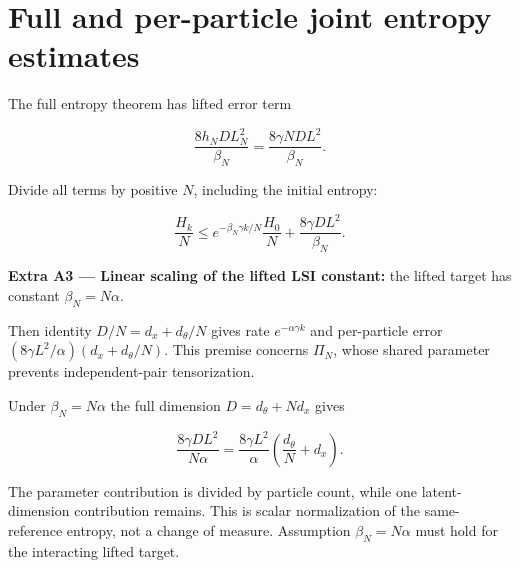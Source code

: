 \documentclass[11pt,a4paper]{article}
\begin{document}
\section{\texorpdfstring{Full and per-particle joint entropy estimates}{Full and per-particle joint entropy estimates}}


The full entropy theorem \cite[Section~3.29.7]{LangevinLean2026ULALSI} has lifted error term

\[\frac{8h_NDL_N^2}{\beta_N}
=\frac{8\gamma NDL^2}{\beta_N}.\]

Divide all terms by positive \(N\), including the initial entropy:

\[\frac{H_k}N\le e^{-\beta_N\gamma k/N}\frac{H_0}N
+\frac{8\gamma DL^2}{\beta_N}.\]

\textbf{Extra A3 — Linear scaling of the lifted LSI constant:} the lifted target has constant \(\beta_N=N\alpha\).



Then identity \(D/N=d_x+d_\theta/N\) gives rate \(e^{-\alpha\gamma k}\) and per-particle error \((8\gamma L^2/\alpha)(d_x+d_\theta/N)\). This premise concerns \(\Pi_N\), whose shared parameter prevents independent-pair tensorization.



Under \(\beta_N=N\alpha\) the full dimension \(D=d_\theta+Nd_x\) gives

\[\frac{8\gamma DL^2}{N\alpha}
=\frac{8\gamma L^2}{\alpha}\left(\frac{d_\theta}{N}+d_x\right).\]

The parameter contribution is divided by particle count, while one latent-dimension contribution remains. This is scalar normalization of the same-reference entropy, not a change of measure. Assumption \(\beta_N=N\alpha\) must hold for the interacting lifted target.
\end{document}
